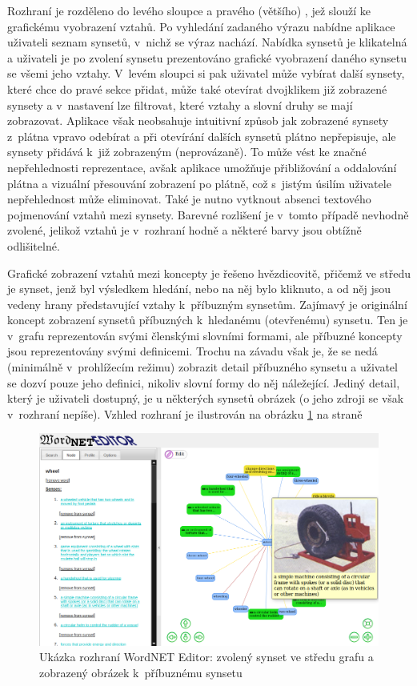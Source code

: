 \documentclass[a4paper,11pt,openany,twoside]{book}
\begin{document}
					Rozhraní je rozděleno do levého sloupce a pravého (většího) , jež slouží ke grafickému vyobrazení vztahů. Po vyhledání zadaného výrazu nabídne aplikace uživateli seznam synsetů, v~nichž se výraz nachází. Nabídka synsetů je klikatelná a uživateli je po zvolení synsetu prezentováno grafické vyobrazení daného synsetu se všemi jeho vztahy. V~levém sloupci si pak uživatel může vybírat další synsety, které chce do pravé sekce přidat, může také otevírat dvojklikem již zobrazené synsety a v~nastavení lze filtrovat, které vztahy a slovní druhy se mají zobrazovat. Aplikace však neobsahuje intuitivní způsob jak zobrazené synsety z~plátna vpravo odebírat a při otevírání dalších synsetů plátno nepřepisuje, ale synsety přidává k~již zobrazeným (neprovázaně). To může vést ke značné nepřehlednosti reprezentace, avšak aplikace umožňuje přibližování a oddalování plátna a vizuální přesouvání zobrazení po plátně, což s~jistým úsilím uživatele nepřehlednost může eliminovat. Také je nutno vytknout absenci textového pojmenování vztahů mezi synsety. Barevné rozlišení je v~tomto případě nevhodně zvolené, jelikož vztahů je v~rozhraní hodně a některé barvy jsou obtížně odlišitelné.

					Grafické zobrazení vztahů mezi koncepty je řešeno hvězdicovitě, přičemž ve středu je synset, jenž byl výsledkem hledání, nebo na něj bylo kliknuto, a od něj jsou vedeny hrany představující vztahy k~příbuzným synsetům. Zajímavý je originální koncept zobrazení synsetů příbuzných k~hledanému (otevřenému) synsetu. Ten je v~grafu reprezentován svými členskými slovními formami, ale příbuzné koncepty jsou reprezentovány svými definicemi. Trochu na závadu však je, že se nedá (minimálně v~prohlížecím režimu) zobrazit detail příbuzného synsetu a uživatel se dozví pouze jeho definici, nikoliv slovní formy do něj náležející. Jediný detail, který je uživateli dostupný, je u některých synsetů obrázek (o jeho zdroji se však v~rozhraní nepíše). Vzhled rozhraní je ilustrován na obrázku \ref{fig:wneditor} na straně \pageref{fig:wneditor}

					\begin{figure}[h]
						\centering
						\includegraphics[width=1.0\textwidth]{wneditor.png}
						\caption{Ukázka rozhraní WordNET Editor: zvolený synset ve středu grafu a zobrazený obrázek k~příbuznému synsetu}
						\label{fig:wneditor}
					\end{figure}
\end{document}
